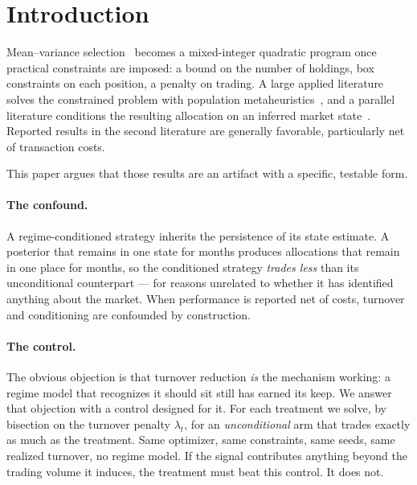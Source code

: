 \documentclass[sigconf,anonymous,review]{acmart}
\begin{document}


\maketitle

\section{Introduction}

Mean--variance selection~\cite{Markowitz1952} becomes a mixed-integer quadratic
program once practical constraints are imposed: a bound on the number of holdings,
box constraints on each position, a penalty on trading. A large applied literature
solves the constrained problem with population
metaheuristics~\cite{Chang2000,Ertenlice2018,Kalayci2019}, and a parallel
literature conditions the resulting allocation on an inferred market
state~\cite{AngBekaert2002,GuidolinTimmermann2007,Kritzman2012,Nystrup2015}.
Reported results in the second literature are generally favorable, particularly
net of transaction costs.

This paper argues that those results are an artifact with a specific, testable
form.

\paragraph{The confound.} A regime-conditioned strategy inherits the persistence
of its state estimate. A posterior that remains in one state for months produces
allocations that remain in one place for months, so the conditioned strategy
\emph{trades less} than its unconditional counterpart --- for reasons unrelated to
whether it has identified anything about the market. When performance is reported
net of costs, turnover and conditioning are confounded by construction.

\paragraph{The control.} The obvious objection is that turnover reduction
\emph{is} the mechanism working: a regime model that recognizes it should sit still
has earned its keep. We answer that objection with a control designed for it. For
each treatment we solve, by bisection on the turnover penalty $\lambda_t$, for an
\emph{unconditional} arm that trades exactly as much as the treatment. Same
optimizer, same constraints, same seeds, same realized turnover, no regime model.
If the signal contributes anything beyond the trading volume it induces, the
treatment must beat this control. It does not.
\end{document}

